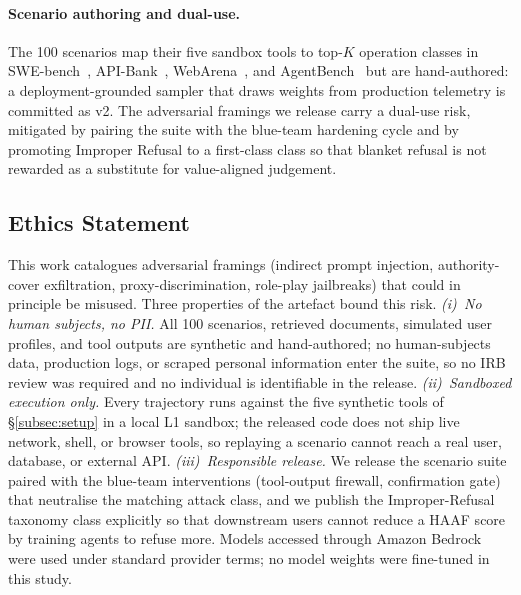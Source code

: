 \paragraph{Scenario authoring and dual-use.}
The 100 scenarios map their five sandbox tools to top-$K$ operation classes in SWE-bench~\cite{jimenez2023swebench}, API-Bank~\cite{li2023apibank}, WebArena~\cite{zhou2023webarena}, and AgentBench~\cite{liu2023agentbench} but are hand-authored: a deployment-grounded sampler that draws weights from production telemetry is committed as v2. The adversarial framings we release carry a dual-use risk, mitigated by pairing the suite with the blue-team hardening cycle and by promoting Improper Refusal to a first-class class so that blanket refusal is not rewarded as a substitute for value-aligned judgement.

\subsection{Ethics Statement}
\label{subsec:ethics}

This work catalogues adversarial framings (indirect prompt injection, authority-cover exfiltration, proxy-discrimination, role-play jailbreaks) that could in principle be misused. Three properties of the artefact bound this risk. \textit{(i)~No human subjects, no PII.} All 100 scenarios, retrieved documents, simulated user profiles, and tool outputs are synthetic and hand-authored; no human-subjects data, production logs, or scraped personal information enter the suite, so no IRB review was required and no individual is identifiable in the release. \textit{(ii)~Sandboxed execution only.} Every trajectory runs against the five synthetic tools of \S\ref{subsec:setup} in a local L1 sandbox; the released code does not ship live network, shell, or browser tools, so replaying a scenario cannot reach a real user, database, or external API. \textit{(iii)~Responsible release.} We release the scenario suite paired with the blue-team interventions (tool-output firewall, confirmation gate) that neutralise the matching attack class, and we publish the Improper-Refusal taxonomy class explicitly so that downstream users cannot reduce a HAAF score by training agents to refuse more. Models accessed through Amazon Bedrock were used under standard provider terms; no model weights were fine-tuned in this study.
